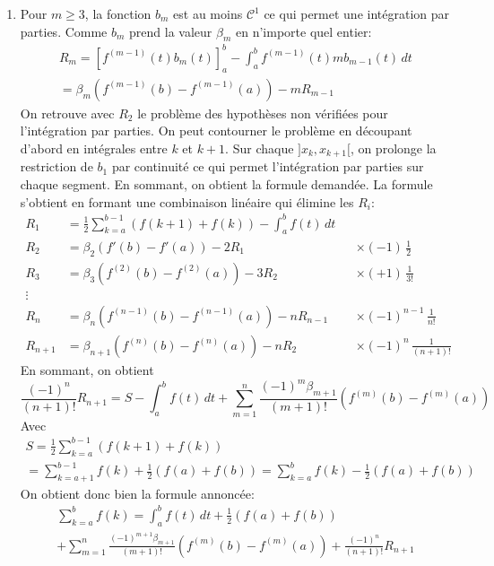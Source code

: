 \begin{enumerate}
\item Pour $m\geq 3$, la fonction $b_m$ est au moins $\mathcal{C}^1$ ce qui permet une intégration par parties. Comme $b_m$ prend la valeur $\beta_m$ en n'importe quel entier:
\begin{multline*}
  R_m = \left[ f^{(m-1)}(t)b_m(t)\right]_a^b - \int_a^bf^{(m-1)}(t)mb_{m-1}(t)\,dt\\
  = \beta_m\left( f^{(m-1)}(b)-f^{(m-1)}(a)\right) - mR_{m-1} 
\end{multline*}
On retrouve avec $R_2$ le problème des hypothèses non vérifiées pour l'intégration par parties. On peut contourner le problème en découpant d'abord en intégrales entre $k$ et $k+1$. Sur chaque $]x_k, x_{k+1}[$, on prolonge la restriction de $b_1$ par continuité ce qui permet l'intégration par parties sur chaque segment. En sommant, on obtient la formule demandée.\newline
La formule s'obtient en formant une combinaison linéaire qui élimine les $R_i$:
\begin{align*}
  R_1 &= \frac{1}{2}\sum_{k=a}^{b-1}\left(f(k+1) + f(k)\right) - \int_a^{b}f(t)\,dt & & \\
  R_2 &= \beta_2(f'(b)-f'(a)) - 2 R_1 & &\times (-1)\,\frac{1}{2} \\
  R_3 &= \beta_3(f^{(2)}(b)-f^{(2)}(a)) - 3 R_2 & &\times (+1)\,\frac{1}{3!} \\
  \vdots &                                & & \\
  R_{n} &= \beta_{n}(f^{(n-1)}(b)-f^{(n-1)}(a)) - n R_{n-1} & &\times (-1)^{n-1}\,\frac{1}{n!} \\
  R_{n+1} &= \beta_{n+1}(f^{(n)}(b)-f^{(n)}(a)) - n R_2 & &\times (-1)^{n}\,\frac{1}{(n+1)!}
\end{align*}
En sommant, on obtient 
\begin{displaymath}
\frac{(-1)^{n}}{(n+1)!}R_{n+1} 
= S - \int_a^{b}f(t)\,dt 
+ \sum_{m=1}^{n}\frac{(-1)^m \beta_{m+1}}{(m+1)!}\left( f^{(m)}(b) - f^{(m)}(a)\right) 
\end{displaymath}
Avec
\begin{multline*}
S = \frac{1}{2}\sum_{k=a}^{b-1}\left(f(k+1) + f(k)\right) \\
= \sum_{k=a+1}^{b-1}f(k)+\frac{1}{2}(f(a)+f(b)) 
= \sum_{k=a}^{b}f(k) - \frac{1}{2}(f(a)+f(b))
\end{multline*}
On obtient donc bien la formule annoncée:
\begin{multline*}
\sum_{k=a}^{b}f(k) = \int_a^{b}f(t)\,dt  + \frac{1}{2}(f(a)+f(b)) \\
+ \sum_{m=1}^{n}\frac{(-1)^{m+1} \beta_{m+1}}{(m+1)!}\left( f^{(m)}(b) - f^{(m)}(a)\right) 
+ \frac{(-1)^{n}}{(n+1)!}R_{n+1}
\end{multline*}


\end{enumerate}
